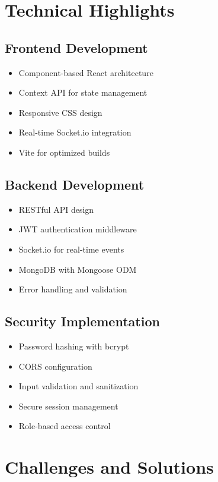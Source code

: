 \section{Technical Highlights}

\subsection{Frontend Development}
\begin{itemize}
    \item Component-based React architecture
    \item Context API for state management
    \item Responsive CSS design
    \item Real-time Socket.io integration
    \item Vite for optimized builds
\end{itemize}

\subsection{Backend Development}
\begin{itemize}
    \item RESTful API design
    \item JWT authentication middleware
    \item Socket.io for real-time events
    \item MongoDB with Mongoose ODM
    \item Error handling and validation
\end{itemize}

\subsection{Security Implementation}
\begin{itemize}
    \item Password hashing with bcrypt
    \item CORS configuration
    \item Input validation and sanitization
    \item Secure session management
    \item Role-based access control
\end{itemize}

\section{Challenges and Solutions}

